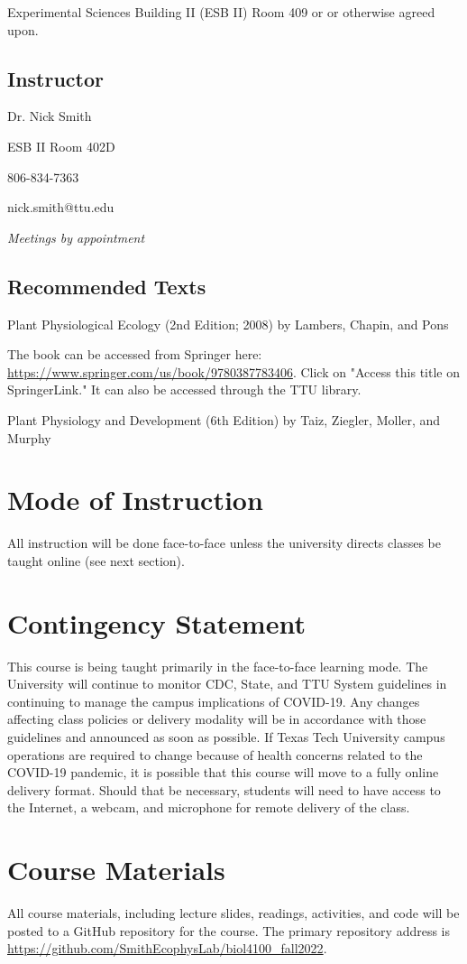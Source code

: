 \documentclass[12pt, notitlepage]{article}   	%
\begin{document}
{Experimental Sciences Building II (ESB II) Room 409 or 
or otherwise agreed upon.

\subsection{Instructor}
Dr. Nick Smith \par
ESB II Room 402D \par
806-834-7363 \par
nick.smith@ttu.edu \par
\textit{Meetings by appointment}

\subsection{Recommended Texts}
Plant Physiological Ecology (2nd Edition; 2008) by Lambers, Chapin, and Pons \par
The book can be accessed from Springer here: 
\url{https://www.springer.com/us/book/9780387783406}. Click on "Access this title on 
SpringerLink." It can also be accessed through the TTU library. \par
Plant Physiology and Development (6th Edition) by Taiz, Ziegler, Moller, and Murphy

\section{Mode of Instruction}
All instruction will be done face-to-face unless the university directs classes be 
taught online (see next section).

\section{Contingency Statement}
This course is being taught primarily in the face-to-face learning mode. 
The University will continue to monitor CDC, State, and TTU System guidelines in 
continuing to manage the campus implications of COVID-19. 
Any changes affecting class policies or delivery modality will be in accordance with 
those guidelines and announced as soon as possible. 
If Texas Tech University campus operations are required to change because of health 
concerns related to the COVID-19 pandemic, it is possible that this course will move 
to a fully online delivery format. 
Should that be necessary, students will need to have access to the Internet, a webcam, 
and microphone for remote delivery of the class. 

\section{Course Materials}
All course materials, including lecture slides, readings, activities, and code 
will be posted to a GitHub repository for the course.
The primary repository address is
\url{https://github.com/SmithEcophysLab/biol4100_fall2022}.

}
\end{document}
